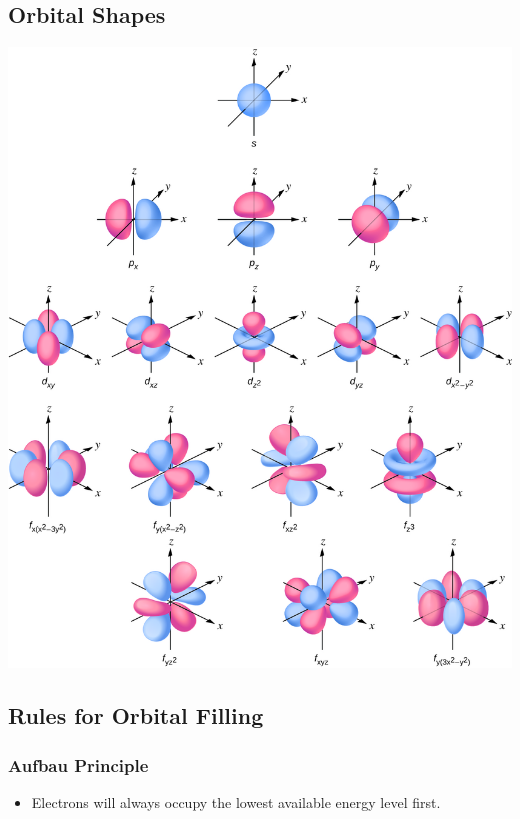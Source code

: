 \documentclass{article}
\begin{document}
\subsection{Orbital Shapes}

\begin{center}
    \includegraphics[scale=0.2]{orbital_shapes}
\end{center}

\subsection{Rules for Orbital Filling}

\subsubsection{Aufbau Principle}

\begin{itemize}
    \item Electrons will always occupy the lowest available energy level first.
\end{itemize}
\end{document}
